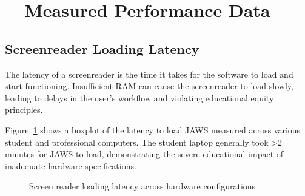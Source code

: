 \hypertarget{measured-performance-data}{}\section{~~Measured Performance Data}\label{measured-performance-data}

\subsection{Screenreader Loading Latency}\label{screenreader-loading-latency}

The latency of a screenreader is the time it takes for the software to load and start functioning. Insufficient RAM can cause the screenreader to load slowly, leading to delays in the user's workflow and violating educational equity principles.

Figure~\ref{fig:figure1} shows a boxplot of the latency to load JAWS measured across various student and professional computers. The student laptop generally took >2 minutes for JAWS to load, demonstrating the severe educational impact of inadequate hardware specifications.

\begin{figure}[htbp]
	\centering
	\caption{Screen reader loading latency across hardware configurations}
	\label{fig:figure1}
\end{figure}

